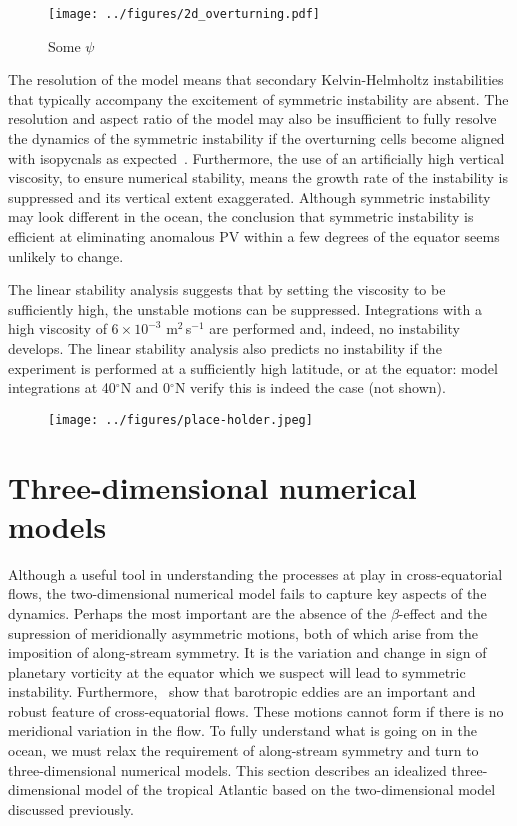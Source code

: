 \begin{figure}
    \centering
    \texttt{[image: ../figures/2d\_overturning.pdf]}
    \caption{Some $\psi$}
\end{figure}

The resolution of the model means that secondary Kelvin-Helmholtz instabilities that typically accompany the excitement of symmetric instability are absent. The resolution and aspect ratio of the model may also be insufficient to fully resolve the dynamics of the symmetric instability if the overturning cells become aligned with isopycnals as expected~\citep{Bachman2014}. Furthermore, the use of an artificially high vertical viscosity, to ensure numerical stability,  means the growth rate of the instability is suppressed and its vertical extent exaggerated. Although symmetric instability may look different in the ocean, the conclusion that symmetric instability is efficient at eliminating anomalous PV within a few degrees of the equator seems unlikely to change.

The linear stability analysis suggests that by setting the viscosity to be sufficiently high, the unstable motions can be suppressed. Integrations with a high viscosity of $6 \times 10^{-3}$ m$^2$\,s$^{-1}$ are performed and, indeed, no instability develops. The linear stability analysis also predicts no instability if the experiment is performed at a sufficiently high latitude, or at the equator: model integrations at 40$^{\circ}$N and 0$^{\circ}$N verify this is indeed the case (not shown).

\begin{figure}
    \centering
    \texttt{[image: ../figures/place-holder.jpeg]}
\end{figure}

\section{Three-dimensional numerical models}
Although a useful tool in understanding the processes at play in cross-equatorial flows, the two-dimensional numerical model fails to capture key aspects of the dynamics. Perhaps the most important are the absence of the $\beta$-effect and the supression of meridionally asymmetric motions, both of which arise from the imposition of along-stream symmetry. It is the variation and change in sign of planetary vorticity at the equator which we suspect will lead to symmetric instability. Furthermore,~\citet{Edwards1998II} show that barotropic eddies are an important and robust feature of cross-equatorial flows. These motions cannot form if there is no meridional variation in the flow. To fully understand what is going on in the ocean, we must relax the requirement of along-stream symmetry and turn to three-dimensional numerical models. This section describes an idealized three-dimensional model of the tropical Atlantic based on the two-dimensional model discussed previously.

